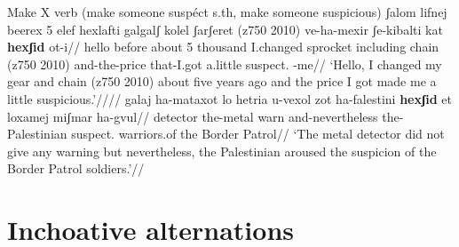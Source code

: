 \pex Make X verb (make someone suspéct s.th, make someone suspicious)
	\a \begingl
		\gla ʃalom lifnej beerex 5 elef hexlafti galgalʃ kolel ʃarʃeret (z750 2010) ve-ha-mexir ʃe-kibalti k{\texttslig}at \textbf{hexʃid} ot-i//
		\glb hello before about 5 thousand I.changed sprocket including chain (z750 2010) and-the-price that-I.got a.little suspect. -me//
		\glft `Hello, I changed my gear and chain (z750 2010) about five years ago and the price I got made me a little suspicious.'////
	\endgl
	\a \begingl
		\gla galaj ha-mataxot lo hetria u-{vexol zot} ha-falestini \textbf{hexʃid} et loxamej {miʃmar ha-gvul}//
		\glb detector the-metal  warn and-nevertheless the-Palestinian suspect.  warriors.of {the Border Patrol}//
		\glft `The metal detector did not give any warning but nevertheless, the Palestinian aroused the suspicion of the Border Patrol soldiers.'//
	\endgl
\xe



%	
%	
%	
%


	



\section{Inchoative alternations} \label{vd:inch}



